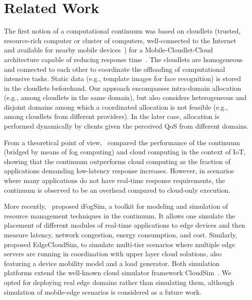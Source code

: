 \section{Related Work}
\label{sec:related}

The first notion of a computational continuum was based on cloudlets (trusted, resource-rich computer or cluster of computers, well-connected to the Internet and available for nearby mobile devices~\cite{Satyanarayanan09cloudlets}) for a Mobile-Cloudlet-Cloud architecture capable of reducing response time~\cite{Soyata:2012}. The cloudlets are homogeneous and connected to each other to coordinate the offloading of computational intensive tasks. Static data (e.g., template images for face recognition) is stored in the cloudlets beforehand. Our approach encompasses intra-domain allocation (e.g., among cloudlets in the same domain), but also considers heterogeneous and disjoint domains among which a coordinated allocation is not feasible (e.g., among cloudlets from different providers). In the later case, allocation is performed dynamically by clients given the perceived QoS from different domains.

From a theoretical point of view,~\cite{sarkar2015assessment} compared the performance of the continuum (bridged by means of fog computing) and cloud computing in the context of IoT, showing that the continuum outperforms cloud computing as the fraction of applications demanding low-latency response increases. However, in scenarios where many applications do not have real-time response requirements, the continuum is observed to be an overhead compared to cloud-only execution.

More recently,~\cite{GuptaIfogSim17} proposed iFogSim, a toolkit for modeling and simulation of resource
management techniques in the continuum. It allows one simulate the placement of different modules of real-time applications to edge devices and then measure latency, network congestion, energy consumption, and cost. Similarly,~\cite{SonmezEgdeCloudSim17} proposed EdgeCloudSim, to simulate multi-tier scenarios where multiple edge servers are running in coordination with upper layer cloud solutions, also featuring a device mobility model and a load generator. Both simulation platforms extend the well-known cloud simulator framework CloudSim~\cite{calheiros2011cloudsim}. We opted for deploying real edge domains rather than simulating them, although simulation of mobile-edge scenarios is considered as a future work.

